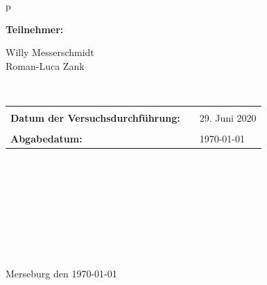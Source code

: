 \begin{center}
\begin{tabular}{p{\textwidth}}

\begin{center}
\Large{\textbf{Teilnehmer:}} \\ 
\end{center}
\begin{center}
\large{Willy Messerschmidt \\
	Roman-Luca Zank} \\
\end{center}


\\

\begin{center}
\begin{tabular}{lll}
&&\\
\large{\textbf{Datum der Versuchsdurchführung:}}&& \large{29. Juni 2020}\\
&&\\
\large{\textbf{Abgabedatum:}}&& \large{\today}
\end{tabular}
\end{center}

\\ \\ \\ \\ \\ \\ \\ \\ 
\large{Merseburg den \today}

\end{tabular}
\end{center}
